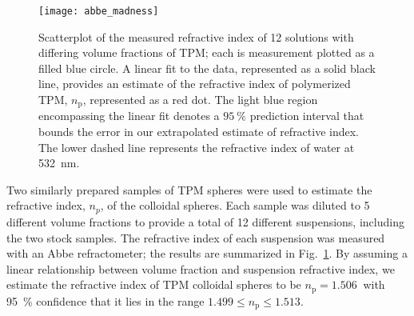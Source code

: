 \begin{figure}
    \centering
    \texttt{[image: abbe\_madness]}
    \caption{Scatterplot of the measured refractive index of \num{12} solutions
      with differing volume fractions of TPM; each is measurement plotted as a filled
      blue circle.
      A linear fit to the data, represented as a solid black line, provides an estimate of
      the refractive index of polymerized TPM, $n_{\text{p}}$, represented as a red dot.
      The light blue region encompassing the linear fit denotes a $\SI{95}{\percent}$
      prediction interval that bounds the error in our extrapolated estimate of refractive
      index.
      The lower dashed line represents the refractive index of water at \SI{532}{\nm}.}
    \label{fig:abbe}
\end{figure}

Two similarly prepared samples of TPM spheres were used to estimate the refractive
index, $n_p$, of the colloidal spheres.
Each sample was diluted to \num{5} different volume fractions to provide a total of
\num{12} different suspensions, including the two stock samples. The refractive index of each
suspension was measured with an Abbe refractometer;
the results are summarized in Fig.~\ref{fig:abbe}.
By assuming a linear relationship between volume fraction and suspension refractive
index, we estimate the refractive index of TPM colloidal spheres to be $n_{\text{p}} = \SI{1.506}{}$ with \SI{95}{\percent} confidence that it lies in the range $1.499 \le n_{\text{p}} \le 1.513$.



